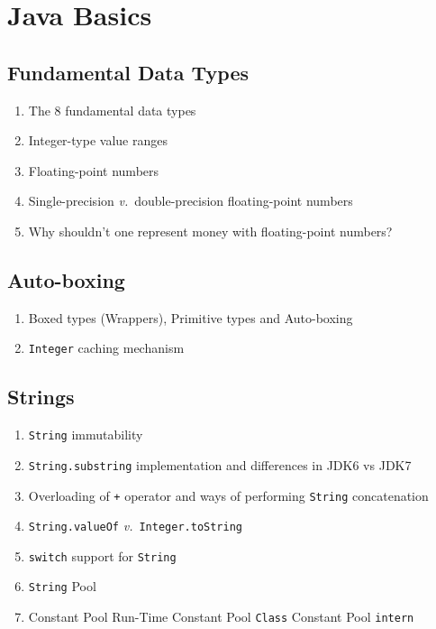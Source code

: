 \documentclass[11pt, twocolumn]{article}
\newcommand{\versus}{\textit{v.}\ }
\begin{document}
\section{Java Basics}

\subsection{Fundamental Data Types}
\begin{enumerate}
	\item The 8 fundamental data types
	\item Integer-type value ranges
	\item Floating-point numbers
	\item Single-precision \versus double-precision floating-point numbers
	\item Why shouldn't one represent money with floating-point numbers?
\end{enumerate}

\subsection{Auto-boxing}
\begin{enumerate}
	\item Boxed types (Wrappers), Primitive types and Auto-boxing
	\item \texttt{Integer} caching mechanism
\end{enumerate}

\subsection{Strings}
\begin{enumerate}
	\item \texttt{String} immutability
	\item \texttt{String.substring} implementation and differences in JDK6 vs JDK7
	\item Overloading of \texttt{+} operator and ways of performing \texttt{String} concatenation
	\item \texttt{String.valueOf} \versus \texttt{Integer.toString}
	\item \texttt{switch} support for \texttt{String}
	\item \texttt{String} Pool
	\item Constant Pool
		\subitem Run-Time Constant Pool
		\subitem \texttt{Class} Constant Pool
		\subitem \texttt{intern}
\end{enumerate}
\end{document}
